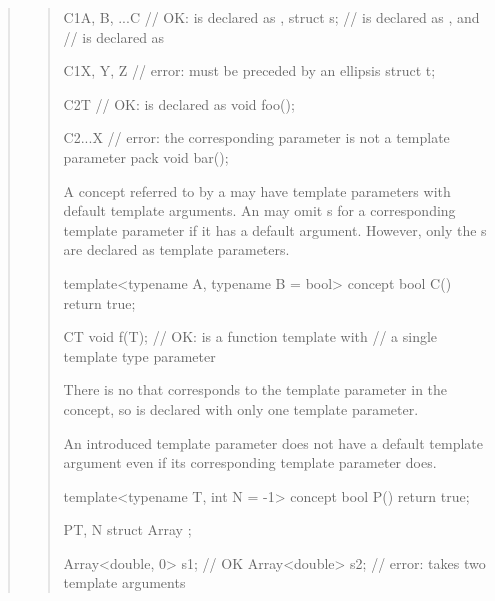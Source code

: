 \begin{quote}
\begin{quote}
\begin{codeblock}
C1{A, B, ...C} // OK:  is declared as ,
  struct s;    //  is declared as , and
               //  is declared as 

C1{X, Y, Z} // error:  must be preceded by an ellipsis
  struct t;

C2{T} // OK:  is declared as 
  void foo();

C2{...X} // error: the corresponding parameter is not a template parameter pack
  void bar();
\end{codeblock}
\exitexample


\pnum
\enternote
A concept referred to by a  may have template 
parameters with default template arguments. An  
may omit s for a corresponding template
parameter if it has a default argument. 
% 
However, only the s are declared
as template parameters. 
% 
\enterexample
\begin{codeblock}
template<typename A, typename B = bool> concept bool C() { return true; }

C{T} void f(T); // OK:  is a function template with
                // a single template type parameter 
\end{codeblock}
There is no  that corresponds to the 
template parameter  in the  concept, so  is 
declared with only one template parameter.
\exitexample
\exitnote


\pnum
An introduced template parameter does not have a default template argument 
even if its corresponding template parameter does.
% 
\enterexample
\begin{codeblock}
template<typename T, int N = -1> concept bool P() { return true; }

P{T, N} struct Array { };

Array<double, 0> s1; // OK
Array<double> s2;    // error:  takes two template arguments
\end{codeblock}
\exitexample



\end{quote}
\end{quote}

